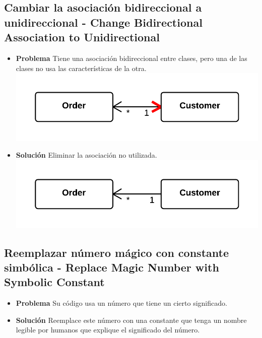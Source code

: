 \documentclass[11pt,a4paper,oneside]{book}
\begin{document}
\subsection{Cambiar la asociación bidireccional a unidireccional - Change Bidirectional Association to Unidirectional}
\label{changebidirectionalassociationtounidirectional}
\begin{itemize}
    \item \textbf{Problema} Tiene una asociación bidireccional entre clases, pero una de las clases no usa las características de la otra.\\
    \centering \includegraphics[scale=0.2]{changebidirectionalassociationtounidirectionalproblem}
    \item \textbf{Solución} Eliminar la asociación no utilizada.\\
    \centering \includegraphics[scale=0.2]{changebidirectionalassociationtounidirectionalsolution}
\end{itemize}
    
\subsection{Reemplazar número mágico con constante simbólica - Replace Magic Number with Symbolic Constant}
\label{replacemagicnumberwithsymbolicconstant}
\begin{itemize}
    \item \textbf{Problema} Su código usa un número que tiene un cierto significado.
    
    \item \textbf{Solución} Reemplace este número con una constante que tenga un nombre legible por humanos que explique el significado del número.
    
\end{itemize}
    
\end{document}
